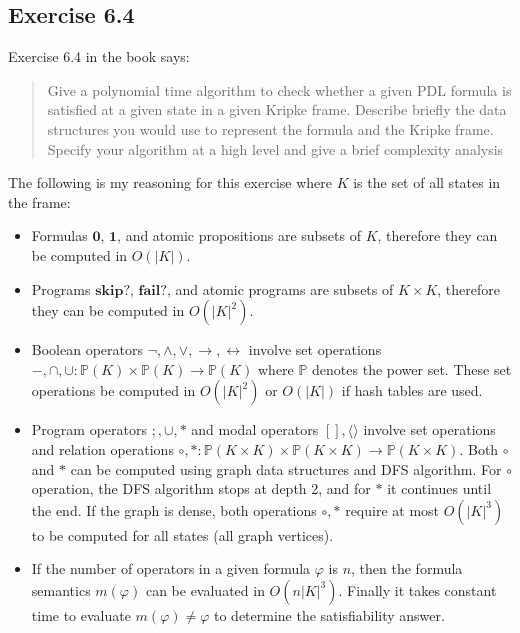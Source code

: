 \documentclass[12pt,a4paper]{article}
\begin{document}
\subsection{Exercise 6.4}
Exercise 6.4 in the book says: 
\begin{quote}
Give a polynomial time algorithm to check whether a given PDL formula
is satisfied at a given state in a given Kripke frame. Describe briefly the data
structures you would use to represent the formula and the Kripke frame. Specify
your algorithm at a high level and give a brief complexity analysis
\end{quote}

The following is my reasoning for this exercise where $K$ is the set of all states in the frame:
\begin{itemize}
\item Formulas $\textbf{0}$, $\textbf{1}$, and atomic propositions are subsets of $K$, therefore they can be computed in $O(\vert K \vert)$.
\item Programs $\textbf{skip}?$, $\textbf{fail}?$, and atomic programs are subsets of $K \times K$, therefore they can be computed in $O(\vert K \vert^2)$.

\item Boolean operators $\neg, \wedge, \vee, \rightarrow, \leftrightarrow$ involve set operations $-, \cap, \cup: \mathbb{P}(K) \times \mathbb{P}(K) \rightarrow \mathbb{P}(K)$ where $\mathbb{P}$ denotes the power set. These set operations be computed in $O(\vert K \vert^2)$ or $O(\vert K \vert)$ if hash tables are used.

\item Program operators $;, \cup, *$ and modal operators $[], \langle \rangle$ involve set operations and relation operations $\circ, *: \mathbb{P}(K \times K) \times \mathbb{P}(K \times K) \rightarrow \mathbb{P}(K \times K)$. Both $\circ$ and $*$ can be computed using graph data structures and DFS algorithm. 
For $\circ$ operation, the DFS algorithm stops at depth 2, and for $*$ it continues until the end. 
If the graph is dense, both operations $\circ, *$ require at most $O(\vert K \vert^3)$ to be computed for all states (all graph vertices). 

\item If the number of operators in a given formula $\varphi$ is $n$, then the formula semantics $m(\varphi)$ can be evaluated in $O(n \vert K \vert ^3)$. Finally it takes constant time to evaluate $m(\varphi) \neq \varphi$ to  determine the satisfiability answer. 
\end{itemize}
\end{document}
